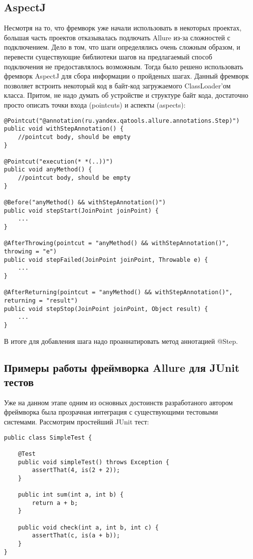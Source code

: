 \subsection{AspectJ}

Несмотря на то, что фремворк уже начали использовать в некоторых проектах, большая часть проектов отказывалась подлючать Allure из-за сложностей с подключением. Дело в том, что шаги определялись очень сложным образом, и перевести существующие библиотеки шагов на предлагаемый способ подключения не предоставлялось возможным. Тогда было решено использовать фремворк AspectJ для сбора информации о пройденых шагах. Данный фремворк позволяет встроить некоторый код в байт-код загружаемого ClassLoader'ом класса. Притом, не надо думать об устройстве и структуре байт кода, достаточно просто описать  точки входа (pointcuts) и аспекты (aspects): 

\newpage
\begin{lstlisting}[caption=Пример описание точек входа и аспектов.]
@Pointcut("@annotation(ru.yandex.qatools.allure.annotations.Step)")
public void withStepAnnotation() {
    //pointcut body, should be empty
}

@Pointcut("execution(* *(..))")
public void anyMethod() {
    //pointcut body, should be empty
}

@Before("anyMethod() && withStepAnnotation()")
public void stepStart(JoinPoint joinPoint) {
    ...
}

@AfterThrowing(pointcut = "anyMethod() && withStepAnnotation()", throwing = "e")
public void stepFailed(JoinPoint joinPoint, Throwable e) {
    ...
}

@AfterReturning(pointcut = "anyMethod() && withStepAnnotation()", returning = "result")
public void stepStop(JoinPoint joinPoint, Object result) {
    ...
}
\end{lstlisting}


В итоге для добавления шага надо проаннатировать метод аннотацией @Step. 

\newpage
\subsection{Примеры работы фреймворка Allure для JUnit тестов}

Уже на данном этапе одним из основных достоинств разработаного автором фреймворка была прозрачная интеграция с существующими тестовыми системами. Рассмотрим простейший JUnit тест:
 
\begin{lstlisting}[caption=Простой JUnit тест.]
public class SimpleTest {

    @Test
    public void simpleTest() throws Exception {
        assertThat(4, is(2 + 2));
    }
    
    public int sum(int a, int b) {
		return a + b;
	}    
    
    public void check(int a, int b, int c) {
    	assertThat(c, is(a + b));	
    }
}
\end{lstlisting}

